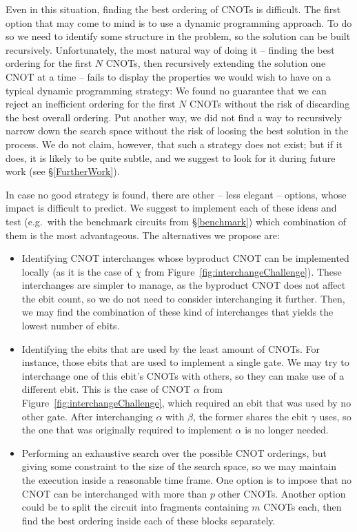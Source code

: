 Even in this situation, finding the best ordering of CNOTs is difficult. The first option that may come to mind is to use a dynamic programming approach. To do so we need to identify some structure in the problem, so the solution can be built recursively. Unfortunately, the most natural way of doing it -- finding the best ordering for the first \(N\) CNOTs, then recursively extending the solution one CNOT at a time -- fails to display the properties we would wish to have on a typical dynamic programming strategy: We found no guarantee that we can reject an inefficient ordering for the first \(N\) CNOTs without the risk of discarding the best overall ordering. Put another way, we did not find a way to recursively narrow down the search space without the risk of loosing the best solution in the process. We do not claim, however, that such a strategy does not exist; but if it does, it is likely to be quite subtle, and we suggest to look for it during future work (see \S\ref{FurtherWork}).

In case no good strategy is found, there are other -- less elegant -- options, whose impact is difficult to predict. We suggest to implement each of these ideas and test (e.g.\ with the benchmark circuits from \S\ref{benchmark}) which combination of them is the most advantageous. The alternatives we propose are:

\begin{itemize}

\item Identifying CNOT interchanges whose byproduct CNOT can be implemented locally (as it is the case of \(\chi\) from Figure~\ref{fig:interchangeChallenge}). These interchanges are simpler to manage, as the byproduct CNOT does not affect the ebit count, so we do not need to consider interchanging it further. Then, we may find the combination of these kind of interchanges that yields the lowest number of ebits.

\item Identifying the ebits that are used by the least amount of CNOTs. For instance, those ebits that are used to implement a single gate. We may try to interchange one of this ebit's CNOTs with others, so they can make use of a different ebit. This is the case of CNOT \(\alpha\) from Figure~\ref{fig:interchangeChallenge}, which required an ebit that was used by no other gate. After interchanging \(\alpha\) with \(\beta\), the former shares the ebit \(\gamma\) uses, so the one that was originally required to implement \(\alpha\) is no longer needed.

\item Performing an exhaustive search over the possible CNOT orderings, but giving some constraint to the size of the search space, so we may maintain the execution inside a reasonable time frame. One option is to impose that no CNOT can be interchanged with more than \(p\) other CNOTs. Another option could be to split the circuit into fragments containing \(m\) CNOTs each, then find the best ordering inside each of these blocks separately.

\end{itemize}

